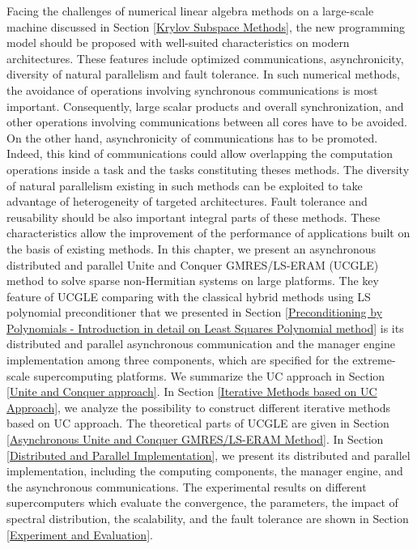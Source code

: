 \begin{displayquote}
	
	\textsf{Facing the challenges of numerical linear algebra methods on a large-scale machine discussed in Section \ref{Krylov Subspace Methods}, the new programming model should be proposed with well-suited characteristics on modern architectures. These features include optimized communications, asynchronicity, diversity of natural parallelism and fault tolerance. In such numerical methods, the avoidance of operations involving synchronous communications is most important. Consequently, large scalar products and overall synchronization, and other operations involving communications between all cores have to be avoided. On the other hand, asynchronicity of communications has to be promoted. Indeed, this kind of communications could allow overlapping the computation operations inside a task and the tasks constituting theses methods. The diversity of natural parallelism existing in such methods can be exploited to take advantage of heterogeneity of targeted architectures. Fault tolerance and reusability should be also important integral parts of these methods. These characteristics allow the improvement of the performance of applications built on the basis of existing methods. In this chapter, we present an asynchronous distributed and parallel Unite and Conquer GMRES/LS-ERAM (UCGLE) method to solve sparse non-Hermitian systems on large platforms. The key feature of UCGLE comparing with the classical hybrid methods using LS polynomial preconditioner \cite{essai1999heterogeneous,he2006hybrid} that we presented in Section \ref{Preconditioning by Polynomials - Introduction in detail on Least Squares Polynomial method} is its distributed and parallel asynchronous communication and the manager engine implementation among three components, which are specified for the extreme-scale supercomputing platforms. We summarize the UC approach in Section \ref{Unite and Conquer approach}. In Section \ref{Iterative Methods based on UC Approach}, we analyze the possibility to construct different iterative methods based on UC approach. The theoretical parts of UCGLE are given in Section \ref{Asynchronous Unite and Conquer GMRES/LS-ERAM Method}. In Section \ref{Distributed and Parallel Implementation}, we present its distributed and parallel implementation, including the computing components, the manager engine, and the asynchronous communications. The experimental results on different supercomputers which evaluate the convergence, the parameters, the impact of spectral distribution, the scalability, and the fault tolerance are shown in Section \ref{Experiment and Evaluation}.}
\end{displayquote}

